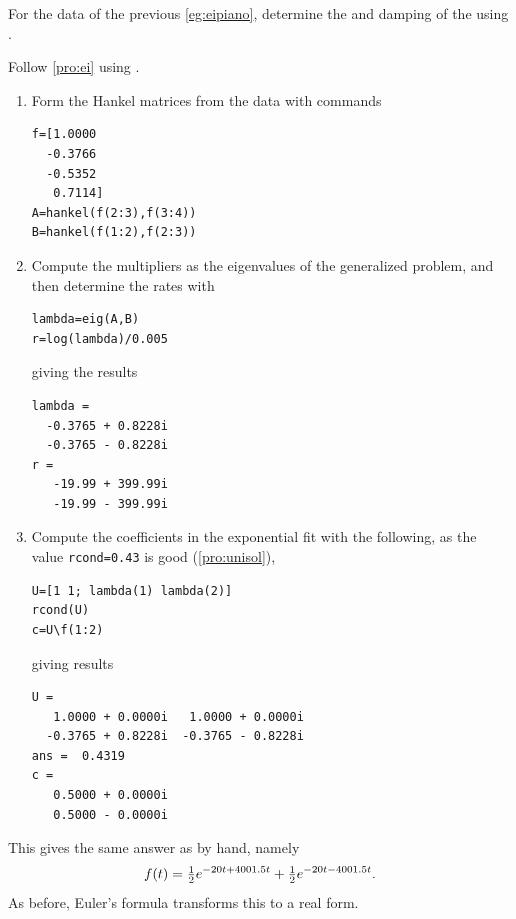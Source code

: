 \begin{example} \label{eg:eipianu}
For the data of the previous \cref{eg:eipiano}, determine the  and damping of the  using \script.

\begin{solution} 
Follow \cref{pro:ei} using \script. 
\begin{enumerate}
\item Form the Hankel matrices from the data with commands
\begin{verbatim}
f=[1.0000
  -0.3766
  -0.5352
   0.7114]
A=hankel(f(2:3),f(3:4))
B=hankel(f(1:2),f(2:3))
\end{verbatim}
\setbox\ajrqrbox\hbox{}%
\marginajrbox%

\item Compute the multipliers as the eigenvalues of the generalized problem, and then determine the rates with
\begin{verbatim}
lambda=eig(A,B)
r=log(lambda)/0.005
\end{verbatim}
giving the results
\begin{verbatim}
lambda =
  -0.3765 + 0.8228i
  -0.3765 - 0.8228i
r =
   -19.99 + 399.99i
   -19.99 - 399.99i
\end{verbatim}


\item Compute the coefficients in the exponential fit with the following, as the value \verb|rcond=0.43| is good (\cref{pro:unisol}),
\begin{verbatim}
U=[1 1; lambda(1) lambda(2)]
rcond(U)
c=U\f(1:2)
\end{verbatim}
giving results
\begin{verbatim}
U =
   1.0000 + 0.0000i   1.0000 + 0.0000i
  -0.3765 + 0.8228i  -0.3765 - 0.8228i
ans =  0.4319
c =
   0.5000 + 0.0000i
   0.5000 - 0.0000i
\end{verbatim}
\end{enumerate}
This gives the same answer as by hand, namely 
\begin{equation*}
f(t)=\tfrac12e^{-20t+4001.5 t}+\tfrac12e^{-20t-4001.5 t}.
\end{equation*}
As before, Euler's formula transforms this to a real form.
\end{solution}
\end{example}




